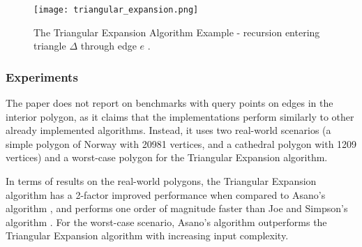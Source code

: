 \begin{figure}[h!]
	\centering
	\texttt{[image: triangular\_expansion.png]}
	\caption{The Triangular Expansion Algorithm Example - recursion entering triangle $\Delta$ through edge $e$ \cite{DBLP:journals/corr/BungiuHHHK14}.}
	\label{fig:triangular}
\end{figure}

\subsubsection{Experiments}
The paper does not report on benchmarks with query points on edges in the interior polygon, as it claims that the implementations perform similarly to other already implemented algorithms. Instead, it uses two real-world scenarios (a simple polygon of Norway with 20981 vertices, and a cathedral polygon with 1209 vertices) and a worst-case polygon for the Triangular Expansion algorithm.

In terms of results on the real-world polygons, the Triangular Expansion algorithm has a 2-factor improved performance when compared to Asano's algorithm \cite{asano1985efficient}, and performs one order of magnitude faster than Joe and Simpson's algorithm \cite{joe1987corrections}. For the worst-case scenario, Asano's algorithm \cite{asano1985efficient} outperforms the Triangular Expansion algorithm with increasing input complexity.

